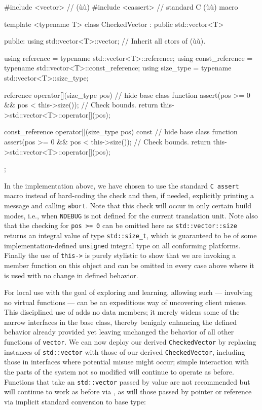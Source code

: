 {\begin{emcppslisting}[emcppsbatch=e8]
#include <vector>   // (ù{}ù)
#include <cassert>  // standard C (ù{}ù) macro

template <typename T>
class CheckedVector : public std::vector<T>
{
public:
    using std::vector<T>::vector;  // Inherit all ctors of (ù{}ù).

    using reference       = typename std::vector<T>::reference;
    using const_reference = typename std::vector<T>::const_reference;
    using size_type       = typename std::vector<T>::size_type;

    reference operator[](size_type pos)              // hide base class function
    {
        assert(pos >= 0 && pos < this->size());      // Check bounds.
        return this->std::vector<T>::operator[](pos);
    }

    const_reference operator[](size_type pos) const  // hide base class function
    {
        assert(pos >= 0 && pos < this->size());      // Check bounds.
        return this->std::vector<T>::operator[](pos);
    }
};
\end{emcppslisting}
    

\noindent In the implementation above, we have chosen to use the standard
\lstinline!C!~\lstinline!assert! macro instead of hard-coding the check and
then, if needed, explicitly printing a message and calling
\lstinline!abort!. Note that this check will occur in only certain build
modes, i.e., when \lstinline!NDEBUG! is not defined for the current
translation unit. Note also that the checking for
\lstinline!pos!~\lstinline!>=!~\lstinline!0! can be omitted here as
\lstinline!std::vector::size! returns an integral value of type
\lstinline!std::size_t!, which is guaranteed to be of some
implementation-defined \lstinline!unsigned! integral type on all conforming
platforms. Finally the use of \lstinline!this->! is purely stylistic to
show that we are invoking a member function on this object and can be
omitted in every case above where it is used with no change in defined
behavior.

For local use with the goal of exploring and learning, allowing such
 --- involving no virtual functions ---
can be an expeditious way of uncovering client misuse. This disciplined
use of  adds no data members; it merely
widens some of the narrow interfaces in the base class, thereby benignly
enhancing the defined behavior already provided yet leaving unchanged
the behavior of all other functions of \lstinline!vector!. We can now
deploy our derived \lstinline!CheckedVector! by replacing instances of
\lstinline!std::vector! with those of our derived \lstinline!CheckedVector!,
including those in interfaces where potential misuse might occur; simple
interaction with the parts of the system not so modified will continue
to operate as before. Functions that take an \lstinline!std::vector! passed
by value are not recommended but will continue to work as before via
, as will those passed by pointer or reference via
implicit standard conversion to base type:

}
